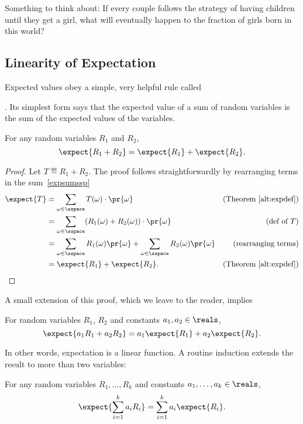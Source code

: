 Something to think about: If every couple follows the strategy of having
children until they get a girl, what will eventually happen to the
fraction of girls born in this world?

\subsection{Linearity of Expectation}\label{finlin}

Expected values obey a simple, very helpful rule called
.  Its simplest
form says that the expected value of a sum of random variables is the sum
of the expected values of the variables.

\begin{theorem}\label{expsum-2}
For any random variables $R_1$ and $R_2$,
\[
\expect{R_1 + R_2} = \expect{R_1} + \expect{R_2}.
\]
\end{theorem}

\begin{proof}
Let $T \eqdef R_1+R_2$.  The proof follows straightforwardly by
rearranging terms in the sum~\eqref{expsumssp}
\begin{align*}
\expect{T} & = \sum_{\omega \in \sspace} T(\omega) \cdot \pr{\omega}
                & \text{(Theorem~\ref{alt:expdef})}\\
        & = \sum_{\omega \in \sspace} (R_1(\omega) + R_2(\omega)) \cdot \pr{\omega}
                         & \text{(def of $T$)}\\
        & = \sum_{\omega \in \sspace} R_1(\omega) \pr{\omega} + 
              \sum_{\omega \in \sspace} R_2(\omega) \pr{\omega} & \text{(rearranging terms)}\\
        & = \expect{R_1} + \expect{R_2}.   & \text{(Theorem~\ref{alt:expdef})}
\end{align*}
\end{proof}

A small extension of this proof, which we leave to the reader, implies
\begin{theorem}
For random variables $R_1$, $R_2$ and constants $a_1,a_2 \in \reals$,
\[
\expect{a_1R_1 + a_2R_2} = a_1\expect{R_1} + a_2\expect{R_2}.
\]
\end{theorem}
In other words, expectation is a linear function.  A routine induction
extends the result to more than two variables:
\begin{corollary}
For any random variables $R_1, \dots, R_k$ and constants $a_1, \dots, a_k
\in \reals$,
\[
\expect{\sum_{i=1}^k a_iR_i} = \sum_{i=1}^k a_i\expect{R_i}.
\]
\end{corollary}

